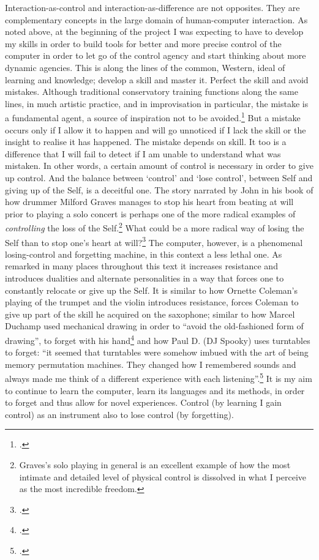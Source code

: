 Interaction-as-control and interaction-as-difference are not opposites. They are complementary concepts in the large domain of human-computer interaction. As noted above, at the beginning of the project I was expecting to have to develop my skills in order to build tools for better and more precise control of the computer in order to let go of the control agency and start thinking about more dynamic agencies. This is along the lines of the common, Western, ideal of learning and knowledge; develop a skill and master it. Perfect the skill and avoid mistakes. Although traditional conservatory training functions along the same lines, in much artistic practice, and in improvisation in particular, the mistake is a fundamental agent, a source of inspiration not to be avoided.\footcite[See][148-60]{evens05} But a mistake occurs only if I allow it to happen and will go unnoticed if I lack the skill or the insight to realise it has happened. The mistake depends on skill. It too is a difference that I will fail to detect if I am unable to understand what was mistaken. In other words, a certain amount of control is necessary in order to give up control. And the balance between `control' and `lose control', between Self and giving up of the Self, is a deceitful one. The story narrated by John \citeauthor{corbett94} in his book  of how drummer Milford Graves manages to stop his heart from beating at will prior to playing a solo concert is perhaps one of the more radical examples of \emph{controlling} the loss of the Self.\footnote{Graves's solo playing in general is an excellent example of how the most intimate and detailed level of physical control is dissolved in what I perceive as the most incredible freedom.} What could be a more radical way of losing the Self than to stop one's heart at will?\footcite[74]{corbett94} The computer, however, is a phenomenal losing-control and forgetting machine, in this context a less lethal one. As remarked in many places throughout this text it increases resistance and introduces dualities and alternate personalities in a way that forces one to constantly relocate or give up the Self. It is similar to how Ornette Coleman's playing of the trumpet and the violin introduces resistance, forces Coleman to give up part of the skill he acquired on the saxophone; similar to how Marcel Duchamp used mechanical drawing in order to ``avoid the old-fashioned form of drawing'', to forget with his hand\footcite[Duchamp quoted in][29]{tomkins65} and how Paul D. \citeauthor{miller08} (DJ Spooky) uses turntables to forget: ``it seemed that turntables were somehow imbued with the art of being memory permutation machines. They changed how I remembered sounds and always made me think of a different experience with each listening''.\footcite[45]{miller04} It is my aim to continue to learn the computer, learn its languages and its methods, in order to forget and thus allow for novel experiences. Control (by learning I gain control) as an instrument also to lose control (by forgetting).

